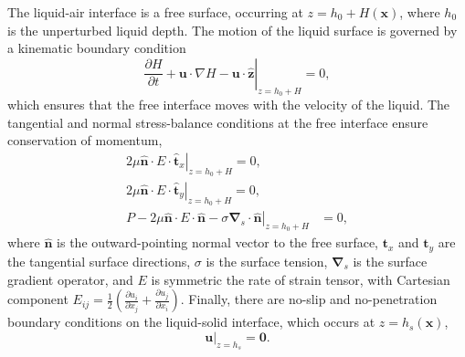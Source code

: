 \documentclass[aps,pre,amsmath,amssymb,floatfix,onecolumn,notitlepage,10pt]{revtex4-1}
\begin{document}
The liquid-air interface is a free surface, occurring at $z=h_0 + H(\mathbf{x})$, where $h_0$ is the unperturbed liquid depth. The motion of the liquid surface is governed by a kinematic boundary condition
\begin{equation}
\left. \frac{\partial H}{\partial t} + \mathbf{u}\cdot\nabla H - \mathbf{u}\cdot\hat{\mathbf{z}} \right\rvert_{z=h_0+H} = 0, \label{kinematic}
\end{equation}
which ensures that the free interface moves with the velocity of the liquid. The tangential and normal  stress-balance conditions at the free interface ensure conservation of momentum,
\begin{align}
\left. 2\mu\hat{\mathbf{n}}\cdot E \cdot \hat{\mathbf{t}}_x  \right\rvert_{z=h_0+H} = 0,  \label{tangentialstress1} \\
\left. 2\mu\hat{\mathbf{n}}\cdot E \cdot \hat{\mathbf{t}}_y  \right\rvert_{z=h_0+H}  = 0, \label{tangentialstress2} \\
\left. P - 2\mu \hat{\mathbf{n}} \cdot E \cdot \hat{\mathbf{n}} - \sigma \bm{\nabla}_s \cdot \hat{\mathbf{n}}  \right\rvert_{z=h_0+H} &= 0, \label{normalstress}
\end{align}
where $\hat{\mathbf{n}}$ %
is the outward-pointing normal vector to the free surface, $\mathbf{t}_x$ and $\mathbf{t}_y$ are the tangential surface directions, $\sigma$ is the surface tension, $\bm{\nabla}_s$ is the surface gradient operator, and $E$ is symmetric the rate of strain tensor, with Cartesian component $E_{ij} = \frac{1}{2}\left(\frac{\partial u_{i}}{\partial x_j} + \frac{\partial u_{j}}{\partial x_i}\right)$.
Finally, there are no-slip and no-penetration boundary conditions on the liquid-solid interface, which occurs at $z=h_s(\mathbf{x})$,
\begin{equation}
\left. \mathbf{u} \right\rvert_{z=h_s} = \mathbf{0}. \label{noslip}
\end{equation}
\end{document}
